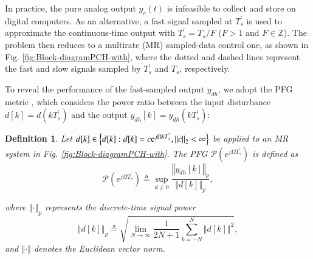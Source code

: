\documentclass [11pt, proquest] {uwthesis}[2020/02/24]
\newtheorem{definition}{Definition}
\begin{document}
In practice, the pure analog output $y_{c}(t)$ is infeasible to collect
and store on digital computers. As an alternative, a fast signal sampled
at $T_{s}^{'}$ is used to approximate the continuous-time output
with $T_{s}^{'}=T_{s}/F$ ($F>1$ and $F\in\mathbb{Z}$). The problem
then reduces to a multirate (MR) sampled-data control one, as shown
in Fig. \ref{fig:Block-diagramPCH-with}, where the dotted and dashed
lines represent the fast and slow signals sampled by $T_{s}^{'}$
and $T_{s}$, respectively.

To reveal the performance of the fast-sampled output $y_{dh}$, we
adopt the PFG metric \cite{lindgarde1997performance}, which considers
the power ratio between the input disturbance $d[k]=d(kT_{s}^{'})$
and the output $y_{dh}[k]=y_{dh}(kT_{s}^{'})$:

\noindent \begin{definition}\label{-Let-} Let $d[k]\in\left\{ d[k]:d[k]=c\mathrm{e}^{j\Omega kT_{s}^{'}},\left\Vert c\right\Vert _{2}<\infty\right\} $
be applied to an MR system in Fig. \ref{fig:Block-diagramPCH-with}.
The PFG $\mathcal{P}(e^{j\Omega T_{s}^{'}})$ is defined as
\begin{equation}
\mathcal{P}(e^{j\Omega T_{s}^{'}})\triangleq\sup_{d\neq0}\frac{\left\Vert y_{dh}[k]\right\Vert _{p}}{\left\Vert d[k]\right\Vert _{p}},\label{eq:Performance_freq_gain}
\end{equation}

\noindent where $\left\Vert \cdot\right\Vert _{p}$ represents the
discrete-time signal power
\begin{equation}
\left\Vert d[k]\right\Vert _{p}\triangleq\sqrt{\lim_{N\rightarrow\infty}\frac{1}{2N+1}\sum_{k=-N}^{N}\left\Vert d[k]\right\Vert ^{2}},\label{eq:Power}
\end{equation}
and $\left\Vert \cdot\right\Vert $ denotes the Euclidean vector norm.\end{definition}
\end{document}
